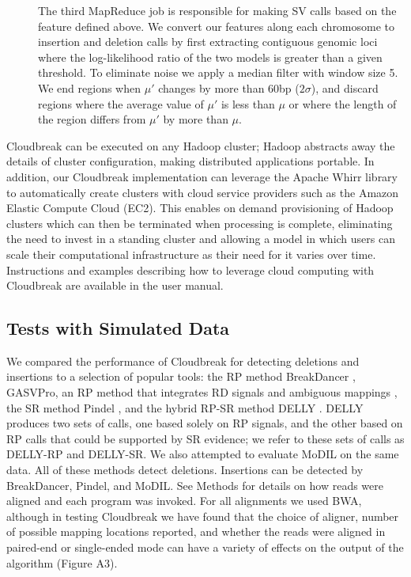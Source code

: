 \documentclass[10pt]{bmc_article}
\newenvironment{bmcformat}{\fussy\setboolean{publ}{true}}{\fussy}
\begin{document}
\begin{bmcformat}
\begin{description}
\item[] The third MapReduce job is responsible for making SV calls based on the feature defined above. We convert our features along each chromosome to insertion and deletion calls by first extracting contiguous genomic loci where the log-likelihood ratio of the two models is greater than a given threshold. To eliminate noise we apply a median filter with window size 5. We end regions when $\mu'$ changes by more than 60bp ($2\sigma$), and discard regions where the average value of $\mu'$ is less than $\mu$ or where the length of the region differs from $\mu'$ by more than $\mu$.
\end{description}

Cloudbreak can be executed on any Hadoop cluster; Hadoop abstracts away the details of cluster configuration, making distributed applications portable. In addition, our Cloudbreak implementation can leverage the Apache Whirr library to automatically create clusters with cloud service providers such as the Amazon Elastic Compute Cloud (EC2). This enables on demand provisioning of Hadoop clusters which can then be terminated when processing is complete, eliminating the need to invest in a standing cluster and allowing a model in which users can scale their computational infrastructure as their need for it varies over time. Instructions and examples describing how to leverage cloud computing with Cloudbreak are available in the user manual.

\subsection*{Tests with Simulated Data}

We compared the performance of Cloudbreak for detecting deletions and insertions to a selection of popular tools: the RP method BreakDancer \cite{Chen:2009p3}, GASVPro, an RP method that integrates RD signals and ambiguous mappings \cite{Sindi:2012kk}, the SR method Pindel \cite{Ye:2009p2}, and the hybrid RP-SR method DELLY \cite{Rausch:2012he}. DELLY produces two sets of calls, one based solely on RP signals, and the other based on RP calls that could be supported by SR evidence; we refer to these sets of calls as DELLY-RP and DELLY-SR. We also attempted to evaluate MoDIL on the same data. All of these methods detect deletions. Insertions can be detected by BreakDancer, Pindel, and MoDIL. See Methods for details on how reads were aligned and each program was invoked. For all alignments we used BWA, although in testing Cloudbreak we have found that the choice of aligner, number of possible mapping locations reported, and whether the reads were aligned in paired-end or single-ended mode can have a variety of effects on the output of the algorithm (Figure A3).


\end{bmcformat}
\end{document}
